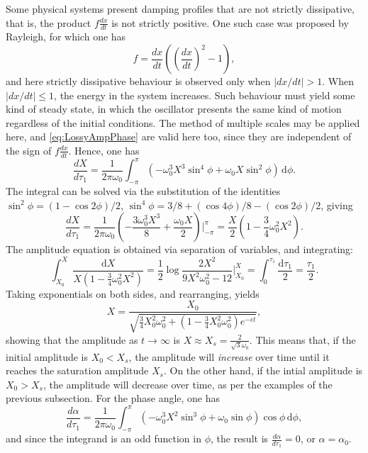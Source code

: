 \documentclass[11pt,twoside,a4paper,english]{book}
\begin{document}
Some physical systems present damping profiles that are not strictly dissipative, that is, the product $f\frac{dx}{dt}$ is not strictly positive. One such case was proposed by Rayleigh, for which one has
\begin{equation}
f = \frac{dx}{dt}\left( \left( \frac{dx}{dt} \right)^2 - 1\right), 
\end{equation}
and here  strictly dissipative behaviour is observed only when $|dx/dt|>1$. When $|dx/dt|\leq 1$, the energy in the system increases. Such behaviour must yield some kind of steady state, in which the oscillator presents the same kind of motion regardless of the initial conditions. The method of multiple scales may be applied here, and \eqref{eq:LossyAmpPhase} are valid here too, since they are independent of the sign of $f\frac{dx}{dt}$. Hence, one has
\begin{equation}
\frac{dX}{d\tau_1} = \frac{1}{2\pi \omega_0}\int_{-\pi}^\pi \left(-\omega_0^3 X^3 \sin^4 \phi + \omega_0 X \sin^2 \phi \right) \,\mathrm{d}\phi.
\end{equation}
The integral can be solved via the substitution of the identities $\sin^2 \phi = (1-\cos 2\phi)/2$, $\sin^4 \phi = 3/8 + (\cos 4\phi) /8 - (\cos 2\phi) /2$, giving
\begin{equation}
\frac{dX}{d\tau_1} = \frac{1}{2\pi\omega_0}\left(- \frac{3 \omega_0^3 X^3}{8} +  \frac{\omega_0 X}{2} \right)\Bigg|_{-\pi}^{\pi} = \frac{X}{2}\left(1 - \frac{3}{4}\omega_0^2 X^2 \right).
\end{equation}
The amplitude equation is obtained via separation of variables, and integrating:
\begin{equation}
\int_{X_0}^X \frac{\mathrm{d}X}{X\left(1- \frac{3}{4}\omega_0^2 X^2 \right)} = \frac{1}{2}\log \frac{2X^2}{9X^2\omega_0^2-12} \Big|_{X_0}^X= \int_{0}^{\tau_1}\frac{\mathrm{d}\tau_1}{2}=\frac{\tau_1}{2}.
\end{equation}
Taking exponentials on both sides, and rearranging, yields
\begin{equation}
X = \frac{X_0}{\sqrt{\frac{3}{4}X_0^2\omega_0^2 + \left(1 -  \frac{3}{4}X_0^2\omega_0^2\right)e^{-\epsilon t}}},
\end{equation}
showing that the amplitude as $t\rightarrow \infty$ is $X \approx X_s = \frac{2}{\sqrt{3}\omega_0}$. This means that, if the initial amplitude is $X_0<X_s$, the amplitude will \emph{increase} over time until it reaches the saturation amplitude $X_s$. On the other hand, if the intial amplitude is $X_0>X_s$, the amplitude will decrease over time, as per the examples of the previous subsection. For the phase angle, one has 
\begin{equation}
\frac{d\alpha}{d\tau_1} = \frac{1}{2\pi \omega_0} \int_{-\pi}^\pi \left(-\omega_0^3 X^2 \sin^3 \phi + \omega_0 \sin \phi \right)\cos\phi \,\mathrm{d}\phi,
\end{equation}
and since the integrand is an odd function in $\phi$, the result is $\frac{d\alpha}{d\tau_1}=0$, or $\alpha=\alpha_0$.
\end{document}
